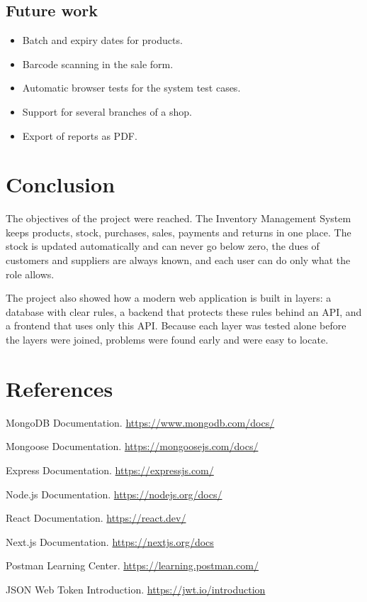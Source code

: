 \documentclass[11pt,a4paper]{article}
\begin{document}
\subsection{Future work}
\begin{itemize}
  \item Batch and expiry dates for products.
  \item Barcode scanning in the sale form.
  \item Automatic browser tests for the system test cases.
  \item Support for several branches of a shop.
  \item Export of reports as PDF.
\end{itemize}

\section{Conclusion}
The objectives of the project were reached. The Inventory Management System keeps products, stock, purchases, sales, payments and returns in one place. The stock is updated automatically and can never go below zero, the dues of customers and suppliers are always known, and each user can do only what the role allows.

The project also showed how a modern web application is built in layers: a database with clear rules, a backend that protects these rules behind an API, and a frontend that uses only this API. Because each layer was tested alone before the layers were joined, problems were found early and were easy to locate.

\section*{References}
\begin{enumerate}[label={[\arabic*]}]
  \item MongoDB Documentation. \url{https://www.mongodb.com/docs/}
  \item Mongoose Documentation. \url{https://mongoosejs.com/docs/}
  \item Express Documentation. \url{https://expressjs.com/}
  \item Node.js Documentation. \url{https://nodejs.org/docs/}
  \item React Documentation. \url{https://react.dev/}
  \item Next.js Documentation. \url{https://nextjs.org/docs}
  \item Postman Learning Center. \url{https://learning.postman.com/}
  \item JSON Web Token Introduction. \url{https://jwt.io/introduction}
\end{enumerate}
\end{document}
